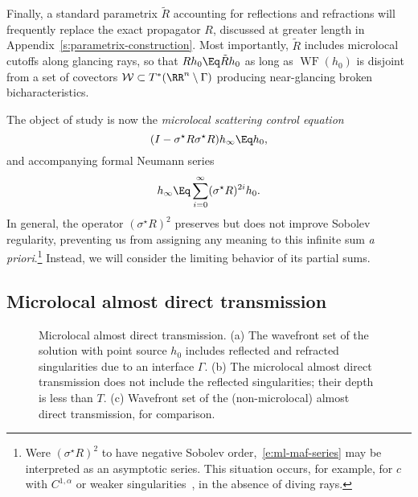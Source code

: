 \documentclass[10pt]{article}
\theoremstyle{plain}
\theoremstyle{definition}
\theoremstyle{remark}
\numberwithin{theorem}{section}
\numberwithin{example}{section}
\numberwithin{equation}{section}
\numberwithin{figure}{section}
\DeclareMathOperator\WF{WF}		%
\newcommand\eqml{\Eq}					%
\begin{document}
Finally, a standard parametrix $\tilde R$ accounting for reflections and refractions will frequently replace the exact propagator $R$, discussed at greater length in Appendix~\ref{s:parametrix-construction}. Most importantly, $\tilde R$ includes microlocal cutoffs along glancing rays, so that $Rh_0\eqml\tilde Rh_0$ as long as $\WF(h_0)$ is disjoint from a set of covectors $\mathcal W\subset T^*(\RR^n\setminus\Gamma)$ producing near-glancing broken bicharacteristics.

The object of study is now the
 \emph{microlocal scattering control equation}
%
\begin{equation}
	(I - \sigma^\star R\sigma^\star R) h_\infty \eqml h_0,
												\label{e:ml-maf}
\end{equation}
%
and accompanying formal Neumann series
%
\begin{equation}
	h_\infty \eqml \sum_{i=0}^\infty (\sigma^\star R)^{2i} h_0.
												\label{e:ml-maf-series}
\end{equation}
%
In general, the operator $(\sigma^\star R)^2$ preserves but does not improve Sobolev regularity, preventing us from assigning any meaning to this infinite sum \emph{a priori}.\footnote{Were $(\sigma^\star R)^2$ to have negative Sobolev order,~\eqref{e:ml-maf-series} may be interpreted as an asymptotic series. This situation occurs, for example, for $c$ with $C^{1,\alpha}$ or weaker singularities~\cite{dHUV}, in the absence of diving rays.}
Instead, we will consider the limiting behavior of its partial sums.

\subsection{Microlocal almost direct transmission}		\label{s:ml-adt}

\begin{figure}[tb]
	\centering
	\hbox{}\hfill
	\hfill
	\hfill\hbox{}

	\hbox{}\hfill
	\hfill\hbox{}
	
	\caption{Microlocal almost direct transmission. (a) The wavefront set of the solution with point source $h_0$ includes reflected and refracted singularities due to an interface $\Gamma$. (b) The microlocal almost direct transmission does not include the reflected singularities; their depth is less than $T$. (c) Wavefront set of the (non-microlocal) almost direct transmission, for comparison.}

	\label{f:ml-adt}
\end{figure}
\end{document}
